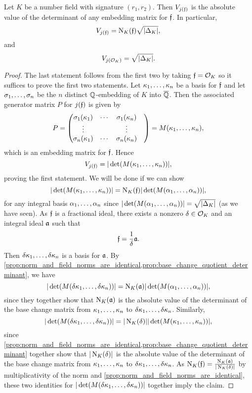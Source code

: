     \begin{proposition}\label{prop:covolume_of_fractional_ideal_under_j}
      Let $K$ be a number field with signature $(r_{1},r_{2})$. Then $V_{j(\mathfrak{f})}$ is the absolute value of the determinant of any embedding matrix for $\mathfrak{f}$. In particular,
      \[
        V_{j(\mathfrak{f})} = \operatorname{\mathrm{N}}_{K}(\mathfrak{f})\sqrt{|\Delta_{K}|},
      \]
      and
      \[
        V_{j(\mathcal{O}_{K})} = \sqrt{|\Delta_{K}|}.
      \]
    \end{proposition}
    \begin{proof}
      The last statement follows from the first two by taking $\mathfrak{f} = \mathcal{O}_{K}$ so it suffices to prove the first two statements. Let $\kappa_{1},\ldots,\kappa_{n}$ be a basis for $\mathfrak{f}$ and let $\sigma_{1},\ldots,\sigma_{n}$ be the $n$ distinct $\mathbb{Q}$-embedding of $K$ into $\overline{\mathbb{Q}}$. Then the associated generator matrix $P$ for $j(\mathfrak{f})$ is given by
      \[
        P = \begin{pmatrix} \sigma_{1}(\kappa_{1}) & \cdots & \sigma_{1}(\kappa_{n}) \\ \vdots & & \vdots & \\ \sigma_{n}(\kappa_{1}) & \cdots & \sigma_{n}(\kappa_{n}) \end{pmatrix} = M(\kappa_{1},\ldots,\kappa_{n}),
      \]
      which is an embedding matrix for $\mathfrak{f}$. Hence
      \[
        V_{j(\mathfrak{f})} = |\det(M(\kappa_{1},\ldots,\kappa_{n}))|,
      \]
      proving the first statement. We will be done if we can show
      \[
        |\det(M(\kappa_{1},\ldots,\kappa_{n}))| = \operatorname{\mathrm{N}}_{K}(\mathfrak{f})|\det(M(\alpha_{1},\ldots,\alpha_{n}))|,
      \]
      for any integral basis $\alpha_{1},\ldots,\alpha_{n}$ since $|\det(M(\alpha_{1},\ldots,\alpha_{n}))| = \sqrt{|\Delta_{K}|}$ (as we have seen). As $\mathfrak{f}$ is a fractional ideal, there exists a nonzero $\delta \in \mathcal{O}_{K}$ and an integral ideal $\mathfrak{a}$ such that
      \[
        \mathfrak{f} = \frac{1}{\delta}\mathfrak{a}.
      \]
      Then $\delta\kappa_{1},\ldots,\delta\kappa_{n}$ is a basis for $\mathfrak{a}$. By \cref{prop:norm_and_field_norms_are_identical,prop:base_change_quotient_determinant}, we have
      \[
        |\det(M(\delta\kappa_{1},\ldots,\delta\kappa_{n}))| = \operatorname{\mathrm{N}}_{K}(\mathfrak{a})|\det(M(\alpha_{1},\ldots,\alpha_{n}))|,
      \]
      since they together show that $\operatorname{\mathrm{N}}_{K}(\mathfrak{a})$ is the absolute value of the determinant of the base change matrix from $\kappa_{1},\ldots,\kappa_{n}$ to $\delta\kappa_{1},\ldots,\delta\kappa_{n}$. Similarly,
      \[
        |\det(M(\delta\kappa_{1},\ldots,\delta\kappa_{n}))| = |\operatorname{\mathrm{N}}_{K}(\delta)||\det(M(\kappa_{1},\ldots,\kappa_{n}))|,
      \]
      since \cref{prop:norm_and_field_norms_are_identical,prop:base_change_quotient_determinant} together show that $|\operatorname{\mathrm{N}}_{K}(\delta)|$ is the absolute value of the determinant of the base change matrix from $\kappa_{1},\ldots,\kappa_{n}$ to $\delta\kappa_{1},\ldots,\delta\kappa_{n}$. As $\operatorname{\mathrm{N}}_{K}(\mathfrak{f}) = \frac{\operatorname{\mathrm{N}}_{K}(\mathfrak{a})}{|\operatorname{\mathrm{N}}_{K}(\delta)|}$ by multiplicativity of the norm and \cref{prop:norm_and_field_norms_are_identical}, these two identities for $|\det(M(\delta\kappa_{1},\ldots,\delta\kappa_{n}))|$ together imply the claim.
    \end{proof}
    
